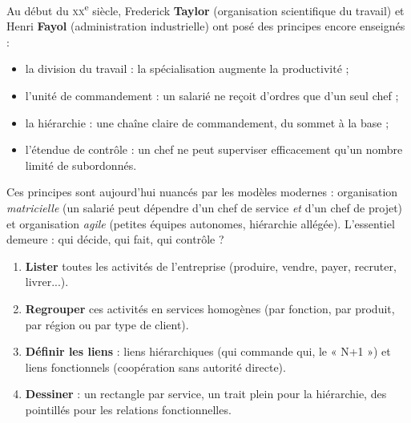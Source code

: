 \documentclass[11pt]{article}
\newcommand{\cle}[1]{{\popxbold\color{popdark}#1}}
\begin{document}
\begin{propriete}
Au début du \textsc{xx}\textsuperscript{e} siècle, Frederick \textbf{Taylor} (organisation scientifique du travail) et Henri \textbf{Fayol} (administration industrielle) ont posé des principes encore enseignés :
\begin{itemize}
\item la \cle{division du travail} : la spécialisation augmente la productivité ;
\item l'\cle{unité de commandement} : un salarié ne reçoit d'ordres que d'un seul chef ;
\item la \cle{hiérarchie} : une chaîne claire de commandement, du sommet à la base ;
\item l'\cle{étendue de contrôle} : un chef ne peut superviser efficacement qu'un nombre limité de subordonnés.
\end{itemize}
Ces principes sont aujourd'hui nuancés par les modèles modernes : organisation \emph{matricielle} (un salarié peut dépendre d'un chef de service \emph{et} d'un chef de projet) et organisation \emph{agile} (petites équipes autonomes, hiérarchie allégée). L'essentiel demeure : qui décide, qui fait, qui contrôle ?
\end{propriete}

\begin{methode}
\begin{enumerate}
\item \textbf{Lister} toutes les activités de l'entreprise (produire, vendre, payer, recruter, livrer...).
\item \textbf{Regrouper} ces activités en services homogènes (par fonction, par produit, par région ou par type de client).
\item \textbf{Définir les liens} : liens hiérarchiques (qui commande qui, le « N+1 ») et liens fonctionnels (coopération sans autorité directe).
\item \textbf{Dessiner} : un rectangle par service, un trait plein pour la hiérarchie, des pointillés pour les relations fonctionnelles.
\end{enumerate}
\end{methode}
\end{document}
